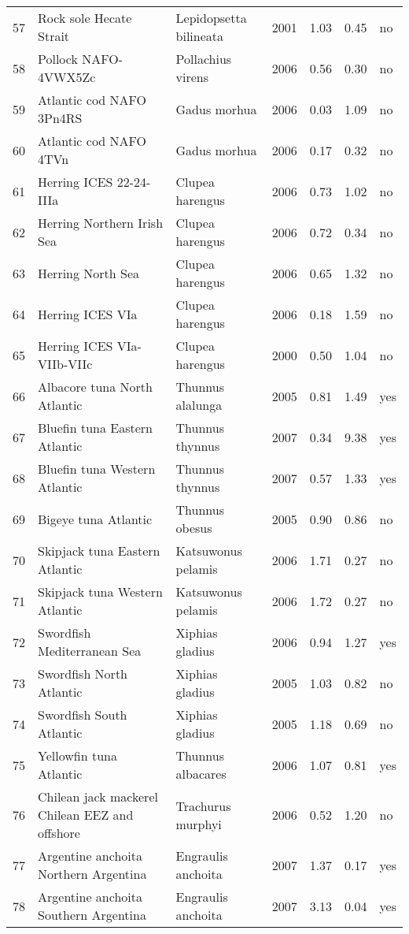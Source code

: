 \begin{table}[ht]
\begin{center}
\begin{tabular}{rllrrrl}
  57 & Rock sole Hecate Strait & Lepidopsetta bilineata & 2001 & 1.03 & 0.45 & no \\
  58 & Pollock NAFO-4VWX5Zc & Pollachius virens & 2006 & 0.56 & 0.30 & no \\
  59 & Atlantic cod NAFO 3Pn4RS & Gadus morhua & 2006 & 0.03 & 1.09 & no \\
  60 & Atlantic cod NAFO 4TVn & Gadus morhua & 2006 & 0.17 & 0.32 & no \\
  61 & Herring ICES 22-24-IIIa & Clupea harengus & 2006 & 0.73 & 1.02 & no \\
  62 & Herring Northern Irish Sea & Clupea harengus & 2006 & 0.72 & 0.34 & no \\
  63 & Herring North Sea & Clupea harengus & 2006 & 0.65 & 1.32 & no \\
  64 & Herring ICES VIa & Clupea harengus & 2006 & 0.18 & 1.59 & no \\
  65 & Herring ICES VIa-VIIb-VIIc & Clupea harengus & 2000 & 0.50 & 1.04 & no \\
  66 & Albacore tuna North Atlantic & Thunnus alalunga & 2005 & 0.81 & 1.49 & yes \\
  67 & Bluefin tuna Eastern Atlantic & Thunnus thynnus & 2007 & 0.34 & 9.38 & yes \\
  68 & Bluefin tuna Western Atlantic & Thunnus thynnus & 2007 & 0.57 & 1.33 & yes \\
  69 & Bigeye tuna Atlantic & Thunnus obesus & 2005 & 0.90 & 0.86 & no \\
  70 & Skipjack tuna Eastern Atlantic & Katsuwonus pelamis & 2006 & 1.71 & 0.27 & no \\
  71 & Skipjack tuna Western Atlantic & Katsuwonus pelamis & 2006 & 1.72 & 0.27 & no \\
  72 & Swordfish Mediterranean Sea & Xiphias gladius & 2006 & 0.94 & 1.27 & yes \\
  73 & Swordfish North Atlantic & Xiphias gladius & 2005 & 1.03 & 0.82 & no \\
  74 & Swordfish South Atlantic & Xiphias gladius & 2005 & 1.18 & 0.69 & no \\
  75 & Yellowfin tuna Atlantic & Thunnus albacares & 2006 & 1.07 & 0.81 & yes \\
  76 & Chilean jack mackerel Chilean EEZ and offshore & Trachurus murphyi & 2006 & 0.52 & 1.20 & no \\
  77 & Argentine anchoita Northern Argentina & Engraulis anchoita & 2007 & 1.37 & 0.17 & yes \\
  78 & Argentine anchoita Southern Argentina & Engraulis anchoita & 2007 & 3.13 & 0.04 & yes \\

\end{tabular}
\end{center}
\end{table}

